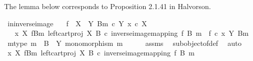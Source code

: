 \begin{isabellebody}
\isamarkupfalse%
%
\endisatagproof
{\isafoldproof}%
%
\isadelimproof
%
\endisadelimproof
%
\begin{isamarkuptext}%
The lemma below corresponds to Proposition 2.1.41 in Halvorson.%
\end{isamarkuptext}\isamarkuptrue%
\isamarkupfalse%
\ in{\isacharunderscore}{\kern0pt}inverse{\isacharunderscore}{\kern0pt}image{\isacharcolon}{\kern0pt}\isanewline
\ \ \ {\isachardoublequoteopen}f\ {\isacharcolon}{\kern0pt}\ X\ {\isasymrightarrow}\ Y{\isachardoublequoteclose}\ {\isachardoublequoteopen}{\isacharparenleft}{\kern0pt}B{\isacharcomma}{\kern0pt}m{\isacharparenright}{\kern0pt}\ {\isasymsubseteq}\isactrlsub c\ Y{\isachardoublequoteclose}\ {\isachardoublequoteopen}x\ {\isasymin}\isactrlsub c\ X{\isachardoublequoteclose}\isanewline
\ \ \ {\isachardoublequoteopen}{\isacharparenleft}{\kern0pt}x\ {\isasymin}\isactrlbsub X\isactrlesub \ {\isacharparenleft}{\kern0pt}f\isactrlsup {\isacharminus}{\kern0pt}B{\isasymrparr}\isactrlbsub m\isactrlesub {\isacharcomma}{\kern0pt}\ left{\isacharunderscore}{\kern0pt}cart{\isacharunderscore}{\kern0pt}proj\ X\ B\ {\isasymcirc}\isactrlsub c\ inverse{\isacharunderscore}{\kern0pt}image{\isacharunderscore}{\kern0pt}mapping\ f\ B\ m{\isacharparenright}{\kern0pt}{\isacharparenright}{\kern0pt}\ {\isacharequal}{\kern0pt}\ {\isacharparenleft}{\kern0pt}f\ {\isasymcirc}\isactrlsub c\ x\ {\isasymin}\isactrlbsub Y\isactrlesub \ {\isacharparenleft}{\kern0pt}B{\isacharcomma}{\kern0pt}m{\isacharparenright}{\kern0pt}{\isacharparenright}{\kern0pt}{\isachardoublequoteclose}\isanewline
%
\isadelimproof
%
\endisadelimproof
%
\isatagproof
{}\isamarkupfalse%
\isanewline
\ \ \isamarkupfalse%
\ m{\isacharunderscore}{\kern0pt}type{\isacharcolon}{\kern0pt}\ {\isachardoublequoteopen}m\ {\isacharcolon}{\kern0pt}\ B\ {\isasymrightarrow}\ Y{\isachardoublequoteclose}\ {\isachardoublequoteopen}monomorphism\ m{\isachardoublequoteclose}\isanewline
\ \ \ \ \isamarkupfalse%
\ assms{\isacharparenleft}{\kern0pt}{}{\isacharparenright}{\kern0pt}\ \isamarkupfalse%
\ subobject{\isacharunderscore}{\kern0pt}of{\isacharunderscore}{\kern0pt}def{}\ \isamarkupfalse%
\ auto\isanewline
\isanewline
\ \ \isamarkupfalse%
\ {\isachardoublequoteopen}x\ {\isasymin}\isactrlbsub X\isactrlesub \ {\isacharparenleft}{\kern0pt}f\isactrlsup {\isacharminus}{\kern0pt}B{\isasymrparr}\isactrlbsub m\isactrlesub {\isacharcomma}{\kern0pt}\ left{\isacharunderscore}{\kern0pt}cart{\isacharunderscore}{\kern0pt}proj\ X\ B\ {\isasymcirc}\isactrlsub c\ inverse{\isacharunderscore}{\kern0pt}image{\isacharunderscore}{\kern0pt}mapping\ f\ B\ m{\isacharparenright}{\kern0pt}{\isachardoublequoteclose}\isanewline

\end{isabellebody}
